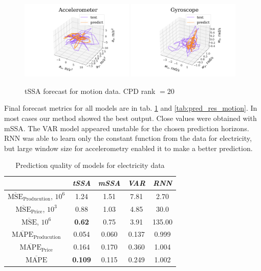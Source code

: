 \documentclass[referee, pdflatex, sn-mathphys-num]{sn-jnl}
\theoremstyle{definition}
\theoremstyle{plain}
\begin{document}
	\begin{figure}[h]
		\centering
		\includegraphics[width=0.48\textwidth, keepaspectratio]{acceler_pred.png}
		\includegraphics[width=0.48\textwidth, keepaspectratio]{gyro_pred.png}
		\caption{tSSA forecast for motion data. CPD rank $ = 20 $}\label{fig:tssa_motion_pred}
	\end{figure}
	
	Final forecast metrics for all models are in tab. \ref{tab:pred_res_electr} and \ref{tab:pred_res_motion}. In most cases our method showed the best output. Close values were obtained with mSSA. The VAR model appeared unstable for the chosen prediction horizons. RNN was able to learn only the constant function from the data for electricity, but large window size for accelerometry enabled it to make a better prediction.
	
	\def\arraystretch{1.2}
	\begin{table}[h]
		\centering
		\caption{Prediction quality of models for electricity data}\label{tab:pred_res_electr}
		\begin{tabular}{|c|c|c|c|c|}
			\hline
			& \textit{tSSA}  & \textit{mSSA} & \textit{VAR} & \textit{RNN} \\ \hline
			$ \overline{\text{MSE}}_{\text{Producution}} $, $10^6$ & 1.24           & 1.51          & 7.81         & 2.70         \\ \hline
			$ \overline{\text{MSE}}_{\text{Price}} $, $10^3$      & 0.88           & 1.03          & 4.85         & 30.0         \\ \hline
			$ \overline{\text{MSE}} $, $10^6$             & \textbf{0.62}  & 0.75          & 3.91         & 135.00       \\ \hline
			$ \overline{\text{MAPE}}_{\text{Producution}} $        & 0.054          & 0.060         & 0.137        & 0.999        \\ \hline
			$ \overline{\text{MAPE}}_{\text{Price}} $             & 0.164          & 0.170         & 0.360        & 1.004        \\ \hline
			$ \overline{\text{MAPE}} $                    & \textbf{0.109} & 0.115         & 0.249        & 1.002        \\ \hline
		\end{tabular}
	\end{table}
	
\end{document}
